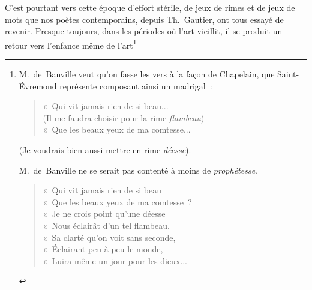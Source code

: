 \documentclass[french,twoside]{book} %
\begin{document}
C’est pourtant vers cette époque d’effort stérile, de jeux de rimes et de jeux de mots que nos poètes contemporains, depuis Th. Gautier, ont tous essayé de revenir. Presque toujours, dans les périodes où l’art vieillit, il se produit un  retour vers l’enfance même de l’art\footnote{\noindent M. de Banville veut qu’on fasse les vers à la façon de Chapelain, que Saint-Évremond représente composant ainsi un madrigal :\par


\begin{verse}
« Qui vit jamais rien de si beau...\\
(Il me faudra choisir pour la rime \emph{flambeau})\\
« Que les beaux yeux de ma comtesse...\\
\end{verse}

\noindent (Je voudrais bien aussi mettre en rime \emph{déesse}).
\par
\noindent M. de Banville ne se serait pas contenté à moins de \emph{prophétesse}.\par


\begin{verse}
« Qui vit jamais rien de si beau\\
« Que les beaux yeux de ma comtesse ?\\
« Je ne crois point qu’une déesse\\
« Nous éclairât d’un tel flambeau.\\
« Sa clarté qu’on voit sans seconde,\\
« Éclairant peu à peu le monde,\\
« Luira même un jour pour les dieux...\\
\end{verse}


}
\end{document}
